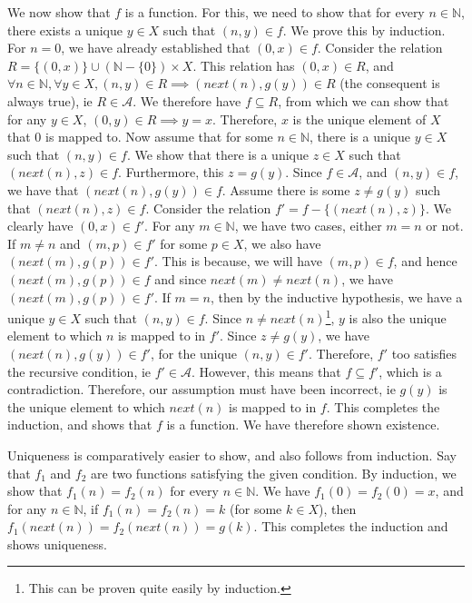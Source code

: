 \documentclass[12pt]{report}
\begin{document}
We now show that $f$ is a function. For this, we need to show that for every $n \in \mathbb{N}$, there exists a unique $y \in X$ such that $(n, y) \in f$. We prove this by induction. For $n = 0$, we have already established that $(0, x) \in f$. Consider the relation $R = \{(0, x)\} \cup (\mathbb{N} - \{0\}) \times X$. This relation has $(0, x) \in R$, and $\forall n \in \mathbb{N}, \forall y \in X, (n, y) \in R \implies (next(n), g(y)) \in R$ (the consequent is always true), ie $R \in \mathcal{A}$. We therefore have $f \subseteq R$, from which we can show that for any $y \in X$, $(0, y) \in R \implies y = x$. Therefore, $x$ is the unique element of $X$ that $0$ is mapped to. Now assume that for some $n \in \mathbb{N}$, there is a unique $y \in X$ such that $(n, y) \in f$. We show that there is a unique $z \in X$ such that $(next(n), z) \in f$. Furthermore, this $z = g(y)$. Since $f \in \mathcal{A}$, and $(n, y) \in f$, we have that $(next(n), g(y)) \in f$. Assume there is some $z \neq g(y)$ such that $(next(n), z) \in f$. Consider the relation $f' = f - \{(next(n), z)\}$. We clearly have $(0, x) \in f'$. For any $m \in \mathbb{N}$, we have two cases, either $m = n$ or not. If $m \neq n$ and $(m, p) \in f'$ for some $p \in X$, we also have $(next(m), g(p)) \in f'$. This is because, we will have $(m, p) \in f$, and hence $(next(m), g(p)) \in f$ and since $next(m) \neq next(n)$, we have $(next(m), g(p)) \in f'$. If $m = n$, then by the inductive hypothesis, we have a unique $y \in X$ such that $(n, y) \in f$. Since $n \neq next(n)$\footnote{This can be proven quite easily by induction.}, $y$ is also the unique element to which $n$ is mapped to in $f'$. Since $z \neq g(y)$, we have $(next(n), g(y)) \in f'$, for the unique $(n, y) \in f'$. Therefore, $f'$ too satisfies the recursive condition, ie $f' \in \mathcal{A}$. However, this means that $f \subseteq f'$, which is a contradiction. Therefore, our assumption must have been incorrect, ie $g(y)$ is the unique element to which $next(n)$ is mapped to in $f$. This completes the induction, and shows that $f$ is a function. We have therefore shown existence.

Uniqueness is comparatively easier to show, and also follows from induction. Say that $f_{1}$ and $f_{2}$ are two functions satisfying the given condition. By induction, we show that $f_{1}(n) = f_{2}(n)$ for every $n \in \mathbb{N}$. We have $f_{1}(0) = f_{2}(0) = x$, and for any $n \in \mathbb{N}$, if $f_{1}(n) = f_{2}(n) = k$ (for some $k \in X$), then $f_{1}(next(n)) = f_{2}(next(n)) = g(k)$. This completes the induction and shows uniqueness. 
\end{document}
